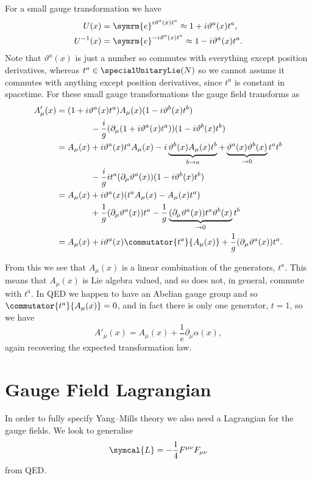 \documentclass[fleqn]{NotesClass}
\newcommand{\e}{\symrm{e}}
\newcommand{\lagrangianDensity}{\symcal{L}}
\begin{document}
    For a small gauge transformation we have
    \begin{align}
        U(x) &= \e^{i\vartheta^a(x)t^a} \approx 1 + i\vartheta^a(x)t^a,\\
        U^{-1}(x) &= \e^{-i\vartheta^a(x)t^a} \approx 1 - i\vartheta^a(x)t^a.
    \end{align}
    Note that \(\vartheta^a(x)\) is just a number so commutes with everything except position derivatives, whereas \(t^a \in \specialUnitaryLie(N)\) so we cannot assume it commutes with anything except position derivatives, since \(t^a\) is constant in spacetime.
    For these small gauge transformations the gauge field transforms as
    \begin{align}
        A_\mu'(x) &= (1 + i\vartheta^a(x)t^a)A_\mu(x)(1 - i\vartheta^b(x)t^b) \notag\\
        &\qquad\qquad - \frac{i}{g}(\partial_\mu(1 + i\vartheta^a(x)t^a))(1 - i\vartheta^b(x)t^b)\\
        &= A_\mu(x) + i\vartheta^a(x)t^aA_\mu(x) - i\underbrace{\vartheta^b(x)A_\mu(x)t^b}_{b \to a} + \underbrace{\vartheta^a(x)\vartheta^b(x)}_{\to 0}t^at^b \notag\\
        &\qquad\qquad - \frac{i}{g}it^a(\partial_\mu \vartheta^a(x))(1 - i\vartheta^b(x)t^b)\\
        &= A_\mu(x) + i\vartheta^a(x)(t^a A_\mu(x) - A_\mu(x)t^a)\\
        &\qquad\qquad + \frac{1}{g}(\partial_\mu\vartheta^a(x))t^a - \frac{1}{g} \underbrace{(\partial_\mu\vartheta^a(x))t^a\vartheta^b(x)}_{\to 0} t^b\\
        &= A_\mu(x) + i\vartheta^a(x)\commutator{t^a}{A_\mu(x)} + \frac{1}{g}(\partial_\mu \vartheta^a(x))t^a.
    \end{align}
    
    From this we see that \(A_\mu(x)\) is a linear combination of the generators, \(t^a\).
    This means that \(A_\mu(x)\) is Lie algebra valued, and so does not, in general, commute with \(t^a\).
    In QED we happen to have an Abelian gauge group and so \(\commutator{t^a}{A_\mu(x)} = 0\), and in fact there is only one generator, \(t = 1\), so we have
    \begin{equation}
        A'_\mu(x) = A_\mu(x) + \frac{1}{e}\partial_\mu\alpha(x),
    \end{equation}
    again recovering the expected transformation law.
    
    \section{Gauge Field Lagrangian}
    In order to fully specify Yang--Mills theory we also need a Lagrangian for the gauge fields.
    We look to generalise
    \begin{equation}
        \lagrangianDensity = -\frac{1}{4}F^{\mu\nu}F_{\mu\nu}
    \end{equation}
    from QED.
    
\end{document}

